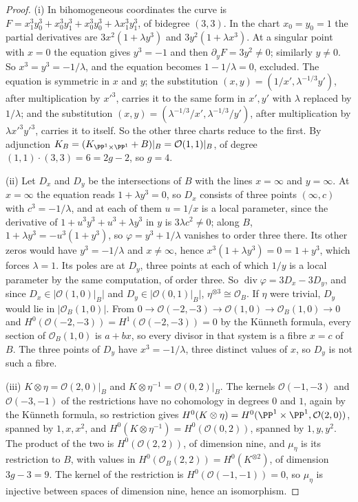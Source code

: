 \begin{proof}
(i) In bihomogeneous coordinates the curve is $F=x_{1}^{3}y_{0}^{3}+x_{0}^{3}y_{1}^{3}+x_{0}^{3}y_{0}^{3}+\lambda x_{1}^{3}y_{1}^{3}$, of bidegree $(3,3)$. In the chart $x_{0}=y_{0}=1$ the partial derivatives are $3x^{2}(1+\lambda y^{3})$ and $3y^{2}(1+\lambda x^{3})$. At a singular point with $x=0$ the equation gives $y^{3}=-1$ and then $\partial_{y}F=3y^{2}\ne0$; similarly $y\ne0$. So $x^{3}=y^{3}=-1/\lambda$, and the equation becomes $1-1/\lambda=0$, excluded. The equation is symmetric in $x$ and $y$; the substitution $(x,y)=(1/x',\lambda^{-1/3}y')$, after multiplication by $x'^{3}$, carries it to the same form in $x',y'$ with $\lambda$ replaced by $1/\lambda$; and the substitution $(x,y)=(\lambda^{-1/3}/x',\lambda^{-1/3}/y')$, after multiplication by $\lambda x'^{3}y'^{3}$, carries it to itself. So the other three charts reduce to the first. By adjunction $K_{B}=(K_{\PP^{1}\times\PP^{1}}+B)|_{B}=\mathcal{O}(1,1)|_{B}$, of degree $(1,1)\cdot(3,3)=6=2g-2$, so $g=4$.

(ii) Let $D_{x}$ and $D_{y}$ be the intersections of $B$ with the lines $x=\infty$ and $y=\infty$. At $x=\infty$ the equation reads $1+\lambda y^{3}=0$, so $D_{x}$ consists of three points $(\infty,c)$ with $c^{3}=-1/\lambda$, and at each of them $u=1/x$ is a local parameter, since the derivative of $1+u^{3}y^{3}+u^{3}+\lambda y^{3}$ in $y$ is $3\lambda c^{2}\ne0$; along $B$, $1+\lambda y^{3}=-u^{3}(1+y^{3})$, so $\varphi=y^{3}+1/\lambda$ vanishes to order three there. Its other zeros would have $y^{3}=-1/\lambda$ and $x\ne\infty$, hence $x^{3}(1+\lambda y^{3})=0=1+y^{3}$, which forces $\lambda=1$. Its poles are at $D_{y}$, three points at each of which $1/y$ is a local parameter by the same computation, of order three. So $\operatorname{div}\varphi=3D_{x}-3D_{y}$, and since $D_{x}\in|\mathcal{O}(1,0)|_{B}|$ and $D_{y}\in|\mathcal{O}(0,1)|_{B}|$, $\eta^{\otimes3}\cong\mathcal{O}_{B}$. If $\eta$ were trivial, $D_{y}$ would lie in $|\mathcal{O}_{B}(1,0)|$. From $0\to\mathcal{O}(-2,-3)\to\mathcal{O}(1,0)\to\mathcal{O}_{B}(1,0)\to0$ and $H^{0}(\mathcal{O}(-2,-3))=H^{1}(\mathcal{O}(-2,-3))=0$ by the K\"unneth formula, every section of $\mathcal{O}_{B}(1,0)$ is $a+bx$, so every divisor in that system is a fibre $x=c$ of $B$. The three points of $D_{y}$ have $x^{3}=-1/\lambda$, three distinct values of $x$, so $D_{y}$ is not such a fibre.

(iii) $K\otimes\eta=\mathcal{O}(2,0)|_{B}$ and $K\otimes\eta^{-1}=\mathcal{O}(0,2)|_{B}$. The kernels $\mathcal{O}(-1,-3)$ and $\mathcal{O}(-3,-1)$ of the restrictions have no cohomology in degrees $0$ and $1$, again by the K\"unneth formula, so restriction gives $H^{0}(K\otimes\eta)=H^{0}(\PP^{1}\times\PP^{1},\mathcal{O}(2,0))$, spanned by $1,x,x^{2}$, and $H^{0}(K\otimes\eta^{-1})=H^{0}(\mathcal{O}(0,2))$, spanned by $1,y,y^{2}$. The product of the two is $H^{0}(\mathcal{O}(2,2))$, of dimension nine, and $\mu_{\eta}$ is its restriction to $B$, with values in $H^{0}(\mathcal{O}_{B}(2,2))=H^{0}(K^{\otimes2})$, of dimension $3g-3=9$. The kernel of the restriction is $H^{0}(\mathcal{O}(-1,-1))=0$, so $\mu_{\eta}$ is injective between spaces of dimension nine, hence an isomorphism.


\end{proof}

